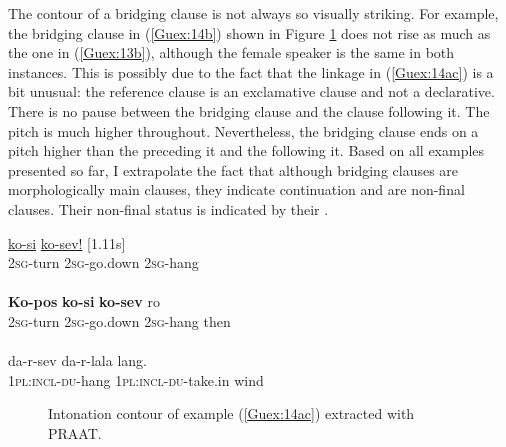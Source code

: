 \documentclass[output=paper]{LSP/langsci}
\begin{document}
The  contour of a bridging clause is not always so visually striking. For example, the bridging clause in (\ref{Guex:14b}) shown in  Figure \ref{GuF4} does not rise as much as the one in (\ref{Guex:13b}), although the female speaker is the same in both instances. This is possibly due to the fact that the linkage in (\ref{Guex:14ac}) is a bit unusual: the reference clause is an exclamative clause and not a declarative. There is no pause between the bridging clause and the clause following it. The pitch is much higher throughout. Nevertheless, the bridging clause ends on a pitch higher than the  preceding it and the  following it. Based on all examples presented so far, I  extrapolate the fact that although bridging clauses are morphologically main clauses, they indicate continuation and are non-final clauses. Their non-final status is indicated by their .


\begin{exe}
\ex \label{Guex:14ac}
\begin{xlist}
\ex \label{Guex:14a}
\gll \underline{}          \underline{ko-si}                 \underline{ko-sev!}     [1.11s]\\
\textsc{2sg}-turn    \textsc{2sg}-go.down   \textsc{2sg}-hang \\
\glt {}\\
\ex \label{Guex:14b}
\gll \textbf{Ko-pos}          \textbf{ko-si}               \textbf{ko-sev}     ro \\
\textsc{2sg}-turn    \textsc{2sg}-go.down   \textsc{2sg}-hang then\\
\glt {}\\
\ex \label{Guex:14c}
\gll   da-r-sev                  da-r-lala               lang.\\     	       
 \textsc{1pl:incl-du}-hang     \textsc{1pl:incl-du}-take.in   wind\\
\glt {} 
\end{xlist}
\end{exe}

\begin{figure}[ht]
\caption{Intonation contour of example (\ref{Guex:14ac}) extracted with PRAAT. \label{GuF4}}
\end{figure}
\end{document}
